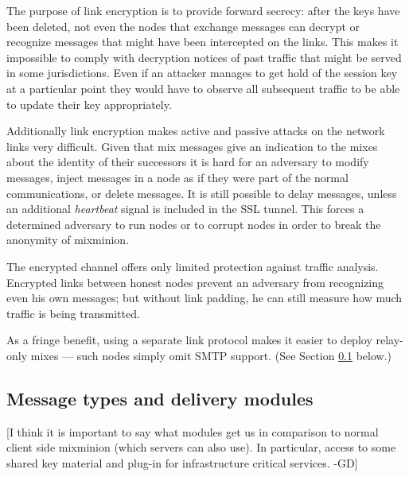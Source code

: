 \documentclass[11pt]{IEEEtran}
\begin{document}
The purpose of link encryption is to provide forward secrecy: 
after the keys have been deleted, not even the
nodes that exchange messages can decrypt or recognize messages
that might have been intercepted on the links. This makes it
impossible to comply with decryption notices of past traffic 
that might be served in
some jurisdictions.  
Even if an
attacker manages to get hold of the session key at a particular point
they would have to observe all subsequent traffic to be able to update
their key appropriately.

Additionally link encryption makes active and passive attacks on the
network links very difficult. Given that mix messages give an
indication to the mixes about the identity of their successors it is
hard for an 
adversary to modify messages, inject messages in a node as if they
were part of the normal communications, or delete messages. It is
still possible to delay messages, unless an additional
\emph{heartbeat} signal is included in the SSL tunnel. This forces a
determined adversary to run nodes or to corrupt nodes in 
order to break the anonymity of mixminion.

The encrypted channel offers only limited protection against traffic
analysis. Encrypted links between honest nodes prevent an adversary
from recognizing even his own messages; but without link padding, he
can still measure how much traffic is being transmitted.

As a fringe benefit, using a separate link protocol makes it
easier to deploy relay-only mixes --- such nodes simply omit SMTP
support.  (See Section \ref{subsec:delivery-modules} below.)

\subsection{Message types and delivery modules}
\label{subsec:delivery-modules}

[I think it is important to say what modules get us in comparison to
normal client side mixminion (which servers can also use). In
particular, access to some shared key material and plug-in for
infrastructure critical services. -GD]
\end{document}
